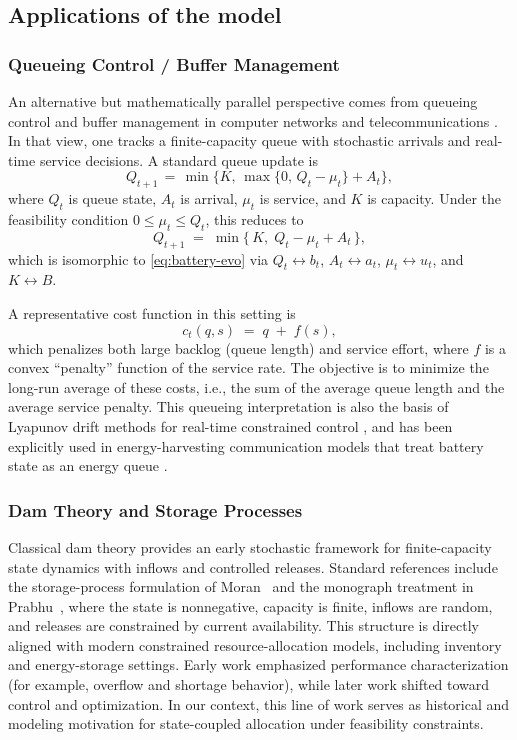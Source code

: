 \documentclass[11pt]{article}
\begin{document}
\subsection{Applications of the model}
\subsubsection{Queueing Control / Buffer Management}

An alternative but mathematically parallel perspective comes from queueing control and buffer management in computer networks and telecommunications \cite{kleinrock1975queueing,leboudec2001network}. In that view, one tracks a finite-capacity queue with stochastic arrivals and real-time service decisions. A standard queue update is
\[
Q_{t+1} \,=\, \min\!\bigl\{K,\,\max\{0,\,Q_t-\mu_t\}+A_t\bigr\},
\]
where \(Q_t\) is queue state, \(A_t\) is arrival, \(\mu_t\) is service, and \(K\) is capacity. Under the feasibility condition \(0\le \mu_t\le Q_t\), this reduces to
\begin{equation*}
Q_{t+1} \;=\; \min\{\,K,\; Q_t-\mu_t+A_t\,\},
\end{equation*}
which is isomorphic to \eqref{eq:battery-evo} via \(Q_t\leftrightarrow b_t\), \(A_t\leftrightarrow a_t\), \(\mu_t\leftrightarrow u_t\), and \(K\leftrightarrow B\).

A representative cost function in this setting is
\[
c_t(q,s) \;=\; q \;+\; f(s),
\]
which penalizes both large backlog (queue length) and service effort, where \(f\) is a convex “penalty” function of the service rate.  
The objective is to minimize the long-run average of these costs, i.e., the sum of the average queue length and the average service penalty. This queueing interpretation is also the basis of Lyapunov drift methods for real-time constrained control \cite{neely2010stochastic}, and has been explicitly used in energy-harvesting communication models that treat battery state as an energy queue \cite{sudevalayam2011energy,sharma2010optimal,yang2011optimal}.


\subsubsection{Dam Theory and Storage Processes}
Classical dam theory provides an early stochastic framework for finite-capacity state dynamics with inflows and controlled releases. Standard references include the storage-process formulation of Moran~\cite{moran1954dams} and the monograph treatment in Prabhu~\cite{prabhu1998stochastic}, where the state is nonnegative, capacity is finite, inflows are random, and releases are constrained by current availability. This structure is directly aligned with modern constrained resource-allocation models, including inventory and energy-storage settings. Early work emphasized performance characterization (for example, overflow and shortage behavior), while later work shifted toward control and optimization. In our context, this line of work serves as historical and modeling motivation for state-coupled allocation under feasibility constraints.
\end{document}
